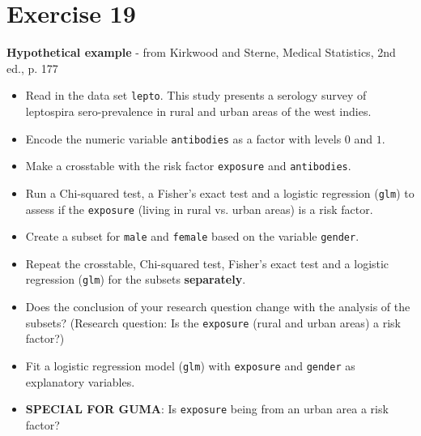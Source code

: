 \documentclass[11pt]{article}\usepackage[]{graphicx}\usepackage[]{color}
\begin{document}
\section*{Exercise 19}
{\bfseries Hypothetical example} - from Kirkwood and Sterne, Medical Statistics, 2nd ed., p. 177
\begin{itemize}
\item Read in the data set \texttt{lepto}. This study presents a serology survey of
leptospira sero-prevalence in rural and urban areas of the west indies.

\item Encode the numeric variable \texttt{antibodies} as a factor with levels $0$ and $1$.

\item Make a crosstable with the risk factor \texttt{exposure} and \texttt{antibodies}.

\item Run a Chi-squared test, a Fisher's exact test and a logistic regression (\texttt{glm})
to assess if the \texttt{exposure} (living in rural vs. urban areas) is a risk factor.

\item Create a subset for \texttt{male} and \texttt{female} based on the variable
\texttt{gender}.

\item Repeat the crosstable, Chi-squared test, Fisher's exact test and a logistic
regression (\texttt{glm}) for the subsets \textbf{separately}.

\item Does the conclusion of your research question change with the analysis of
the subsets? (Research question: Is the \texttt{exposure} (rural and urban areas)
a risk factor?)
\item Fit a logistic regression model (\texttt{glm}) with \texttt{exposure} and
\texttt{gender} as explanatory variables.

\item \textbf{SPECIAL FOR GUMA}: Is \texttt{exposure} being from an urban area
a risk factor?


\end{itemize}
\end{document}
